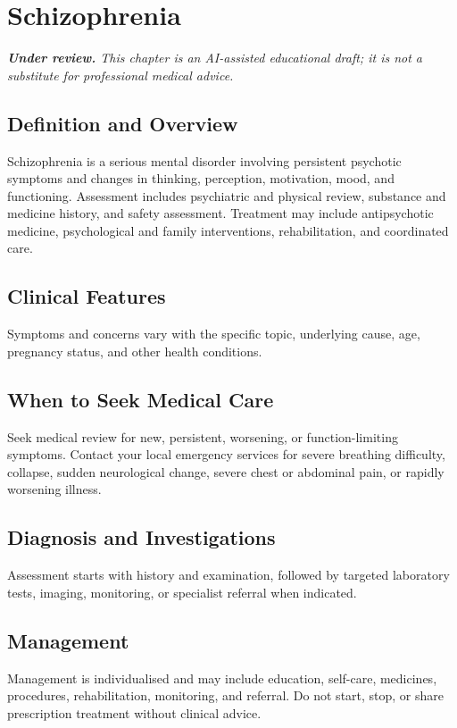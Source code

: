 \chapter{Schizophrenia}

\medskip
\noindent\textit{\textbf{Under review.} This chapter is an AI-assisted educational draft; it is not a substitute for professional medical advice.}

\section*{Definition and Overview}
Schizophrenia is a serious mental disorder involving persistent psychotic symptoms and changes in thinking, perception, motivation, mood, and functioning. Assessment includes psychiatric and physical review, substance and medicine history, and safety assessment. Treatment may include antipsychotic medicine, psychological and family interventions, rehabilitation, and coordinated care.

\section*{Clinical Features}
Symptoms and concerns vary with the specific topic, underlying cause, age, pregnancy status, and other health conditions.

\section*{When to Seek Medical Care}
Seek medical review for new, persistent, worsening, or function-limiting symptoms. Contact your local emergency services for severe breathing difficulty, collapse, sudden neurological change, severe chest or abdominal pain, or rapidly worsening illness.

\section*{Diagnosis and Investigations}
Assessment starts with history and examination, followed by targeted laboratory tests, imaging, monitoring, or specialist referral when indicated.

\section*{Management}
Management is individualised and may include education, self-care, medicines, procedures, rehabilitation, monitoring, and referral. Do not start, stop, or share prescription treatment without clinical advice.

